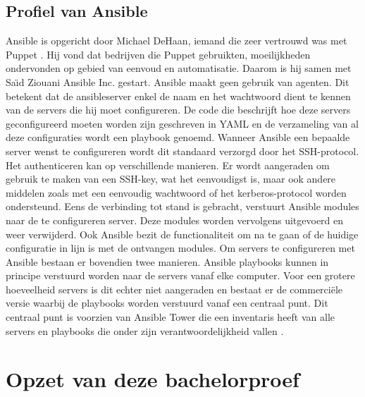 \subsection{Profiel van Ansible}
Ansible is opgericht door Michael DeHaan, iemand die zeer vertrouwd was met Puppet \autocite{ansiblefordevops}. Hij vond dat bedrijven die Puppet gebruikten, moeilijkheden ondervonden op gebied van eenvoud en automatisatie. Daarom is hij samen met Sa{\"\i}d Ziouani Ansible Inc. gestart. 
Ansible maakt geen gebruik van agenten. Dit betekent dat de ansibleserver enkel de naam en het wachtwoord dient te kennen van de servers die hij moet configureren. De code die beschrijft hoe deze servers geconfigureerd moeten worden zijn geschreven in YAML en de verzameling van al deze configuraties wordt een playbook genoemd. Wanneer Ansible een bepaalde server wenst te configureren wordt dit standaard verzorgd door het SSH-protocol. Het authenticeren kan op verschillende manieren. Er wordt aangeraden om gebruik te maken van een SSH-key, wat het eenvoudigst is, maar ook andere middelen zoals met een eenvoudig wachtwoord of het kerberos-protocol worden ondersteund. Eens de verbinding tot stand is gebracht, verstuurt Ansible modules naar de te configureren server. Deze modules worden vervolgens uitgevoerd en weer verwijderd. Ook Ansible bezit de functionaliteit om na te gaan of de huidige configuratie in lijn is met de ontvangen modules. Om servers te configureren met Ansible bestaan er bovendien twee manieren. Ansible playbooks kunnen in principe verstuurd worden naar de servers vanaf elke computer. Voor een grotere hoeveelheid servers is dit echter niet aangeraden en bestaat er de commerci\"ele versie waarbij de playbooks worden verstuurd vanaf een centraal punt. Dit centraal punt is voorzien van Ansible Tower die een inventaris heeft van alle servers en playbooks die onder zijn verantwoordelijkheid vallen \autocite{ansibledoc}.







\section{Opzet van deze bachelorproef}
\label{sec:opzet-bachelorproef}

